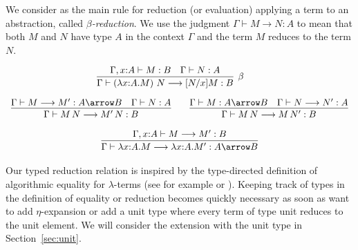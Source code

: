 \documentclass{article}
\newcommand{\red}{\longrightarrow}
\begin{document}
We consider as the main rule for reduction (or evaluation) applying a term to an abstraction, called \emph{$\beta$-reduction}.
 We use the judgment $\Gamma \vdash M \red N :A$ to mean that both $M$ and $N$ have type $A$ in the context $\Gamma$ and the term $M$ reduces to the term $N$.



\[
\begin{array}{c}
\infer[\beta]
{\Gamma \vdash (\lambda x{:}A.M)~N  \red [N/x]M : B }
    {\Gamma, x{:}A \vdash M :  B & \Gamma \vdash  N : A}
\qquad
\\[1em]
\infer{\Gamma \vdash M\,N \red M'\,N : B}{\Gamma \vdash M \red M' : A \arrow B & \Gamma \vdash N : A}
\qquad
\infer{\Gamma \vdash M\,N \red M\,N' : B}{\Gamma \vdash M : A \arrow B & \Gamma \vdash N \red N' : A}
\\[1em]
\infer{\Gamma \vdash \lambda x{:}A.M \red \lambda x{:}A.M' : A \arrow B}{\Gamma, x{:}A \vdash M \red M' : B}
\end{array}
\]

Our typed reduction relation is inspired by the type-directed
definition of algorithmic equality for $\lambda$-terms (see for
example \cite{Crary:ATAPL} or \cite{Harper03tocl}). Keeping track of
types in the definition of equality or reduction becomes quickly
necessary as soon as want to add $\eta$-expansion or add a unit type
where every term of type unit reduces to the unit element. We will
consider the extension with the unit type in Section~\ref{sec:unit}.
\end{document}
